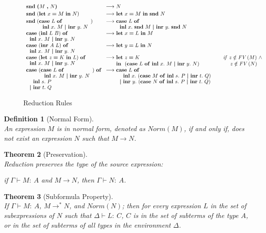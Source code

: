 \documentclass[11p,a4paper]{article}
\makeatletter
\newcommand{\typecolor}{}
\newcommand{\termcolor}{}
\newcommand{\tp}[1]{{\typecolor #1}}
\newcommand{\tm}[1]{{\termcolor #1}}
\newtheorem{theorem}{Theorem}
\newtheorem{definition}[theorem]{Definition}
\newcommand{\expshr}[3]{\mathbf{let}\ #1\boldsymbol{=}#2\ \mathbf{in}\ #3}
\newcommand{\expshrind}[3]{\begin{array}[t]{@{}l}\mathbf{let}\ #1\boldsymbol{=}#2\\ \mathbf{in}\ \ #3\end{array}}
\newcommand{\expprd}[2]{\boldsymbol{(}#1\ \boldsymbol{,}\ #2\boldsymbol{)}}
\newcommand{\expsnd}[1]{\mathbf{snd}\ #1}
\newcommand{\explft}[2]{\mathbf{inl}\ #1\ #2}
\newcommand{\exprgt}[2]{\mathbf{inr}\ #1\ #2}
\newcommand{\expcas}[5]{\mathbf{case}\ #1\ \mathbf{of}\ \mathbf{inl}\ #2.\ #3\ \boldsymbol{|}\ \mathbf{inr}\ #4.\ #5}
\newcommand{\expcasind}[5]{\begin{array}[t]{@{}l}\mathbf{case}\ #1\ \mathbf{of}\\[-1pt] \ \ \mathbf{inl}\ #2.\ #3\ \boldsymbol{|}\ \mathbf{inr}\ #4.\ #5\end{array}}
\newcommand{\expcasindind}[5]{\begin{array}[t]{@{}l}\mathbf{case}\ #1\ \mathbf{of}\\[-1pt] \ \ \ \ \mathbf{inl}\ #2.\ #3\ \\[-1pt] \ \ \boldsymbol{|}\ \mathbf{inr}\ #4.\ #5\end{array}}
\newcommand{\env}{\tp{\Gamma}}
\newcommand{\typing}[2]{\tm{#1:\ }\tp{#2}}
\newcommand{\fv}[1]{\txt{FV}\,(#1)}
\newcommand{\txt}[1]{\text{\emph{#1}}}
\newcommand{\reduce}[2]{#1 \longrightarrow^* #2}
\newcommand{\cnd}[1]{\begin{array}[t]{l}\txt{if}\ #1\end{array}}
\makeatother
\begin{document}
\begin{figure*}[h]
\[\begin{array}[t]{l@{\ \longrightarrow\ }ll}
\expsnd{\expprd{M}{N}} 
& N                                               
& \\[2pt]

\expsnd{(\expshr{x}{M}{N})} 
& \expshr{x}{M}{\expsnd{N}}                     
& \\[2pt]

\expsnd{(\expcasind{L}{x}{M}{y}{N})}          
& \expcasind{L}{x}{\expsnd{M}}{y}{\expsnd{N}}
& \\[2pt]
 
\expcasind{(\explft{L}{B})}{x}{M}{y}{N}
& \expshr{x}{L}{M}                             
& \\[2pt]
 
\expcasind{(\exprgt{A}{L})}{x}{M}{y}{N}
& \expshr{y}{L}{N}                             
& \\[2pt]

\expcasind{(\expshr{z}{K}{L})}{x}{M}{y}{N}
 
& \expshrind{z}{K}{(\expcas{L}{x}{M}{y}{N})}       
& \cnd{z \notin \fv{M}\ \wedge \\ \ \ \ \ z \notin \fv{N}}  \\[2pt]
 
\expcasindind{(\expcasind{L}{x}{M}{y}{N})}{s}{P}{t}{Q} 
& \expcasindind{L}{x}{(\expcas{M}{s}{P}{t}{Q})}{y}{(\expcas{N}{s}{P}{t}{Q})} 
& \\[2pt]

\end{array}
\]
\caption{Reduction Rules}
\label{fig:red}
\end{figure*} 

\begin{definition}[Normal Form]\ \\
An expression $M$ is in normal form, denoted as $Norm(M)$, if and only
if, does not exist an expression $N$ such that $M \longrightarrow
N$.
\end{definition}

\begin{theorem}[Preservation]\ \\
Reduction preserves the type of the source expression:
 
 if $\env \vdash \typing{M}{A}$ and $M \longrightarrow N$, then 
$\env \vdash \typing{N}{A}$.
\end{theorem}

\begin{theorem}[Subformula Property]\ \\
If $\Gamma \vdash \typing{M}{A}$, $\reduce{M}{N}$, and $Norm(N)$;
then for every expression $L$ in the set of subexpressions of $N$ such
that $\Delta \vdash \typing{L}{C}$, $C$ is in the set of subterms of
the type $A$, or in the set of subterms of all types in the
environment $\Delta$.
\end{theorem}
 
\end{document}
